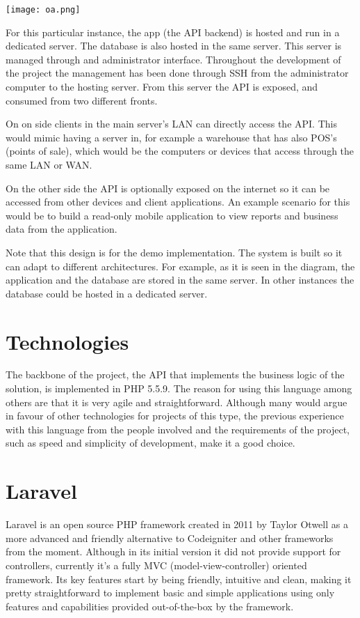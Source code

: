 \texttt{[image: oa.png]}

For this particular instance, the app (the API backend) is hosted and run in a dedicated server. The database is also hosted in the same server. This server is managed through and administrator interface. Throughout the development of the project the management has been done through SSH from the administrator computer to the hosting server. From this server the API is exposed, and consumed from two different fronts. 

On on side clients in the main server’s LAN can directly access the API. This would mimic having a server in, for example a warehouse that has also POS’s (points of sale), which would be the computers or devices that access through the same LAN or WAN.

On the other side the API is optionally exposed on the internet so it can be accessed from other devices and client applications. An example scenario for this would be to build a read-only mobile application to view reports and business data from the application.

Note that this design is for the demo implementation. The system is built so it can adapt to different architectures. For example, as it is seen in the diagram, the application and the database are stored in the same server. In other instances the database could be hosted in a dedicated server.

\section{Technologies}
The backbone of the project, the API that implements the business logic of the solution, is implemented in PHP 5.5.9. The reason for using this language among others are that it is very agile and straightforward. Although many would argue in favour of other technologies for projects of this type, the previous experience with this language from the people involved and the requirements of the project, such as speed and simplicity of development, make it a good choice.

\section{Laravel}
Laravel is an open source PHP framework created in 2011 by Taylor Otwell as a more advanced and friendly alternative to Codeigniter and other frameworks from the moment. Although in its initial version it did not provide support for controllers, currently it’s a fully MVC (model-view-controller) oriented framework. Its key features start by being friendly, intuitive and clean, making it pretty straightforward to implement basic and simple applications using only features and capabilities provided out-of-the-box by the framework.


